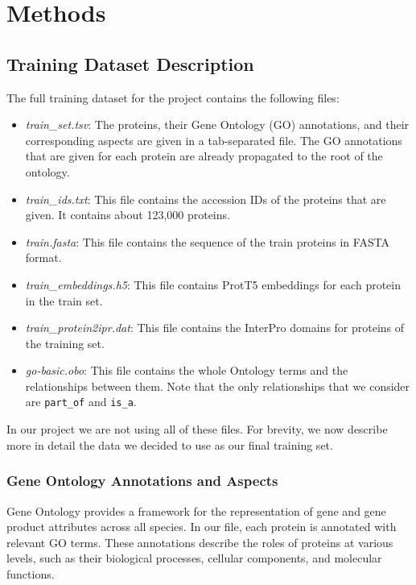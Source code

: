 \documentclass[10pt,twocolumn,letterpaper]{article}
\begin{document}
\section{Methods}

\subsection{Training Dataset Description}

The full training dataset for the project contains the following files:

\begin{itemize}
    \item \textit{train\_set.tsv}: The proteins, their Gene Ontology (GO) annotations, and their corresponding aspects are given in a tab-separated file. The GO annotations that are given for each protein are already propagated to the root of the ontology.

    \item \textit{train\_ids.txt}: This file contains the accession IDs of the proteins that are given. It contains about 123,000 proteins.

    \item \textit{train.fasta}: This file contains the sequence of the train proteins in FASTA format.

    \item \textit{train\_embeddings.h5}: This file contains ProtT5 embeddings for each protein in the train set.

    \item \textit{train\_protein2ipr.dat}: This file contains the InterPro domains for proteins of the training set.

    \item \textit{go-basic.obo}: This file contains the whole Ontology terms and the relationships between them. Note that the only relationships that we consider are \texttt{part\_of} and \texttt{is\_a}.
\end{itemize}

In our project we are not using all of these files. For brevity, we now describe more in detail the data we decided to use as our final training set.


\subsubsection{Gene Ontology Annotations and Aspects}

Gene Ontology provides a framework for the representation of gene and gene product attributes across all species. In our file, each protein is annotated with relevant GO terms. These annotations describe the roles of proteins at various levels, such as their biological processes, cellular components, and molecular functions.
\end{document}
